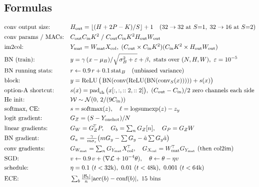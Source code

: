 \subsection*{Formulas}
\begin{align*}
&\text{conv output size:} && H_\text{out}=\lfloor (H+2P-K)/S\rfloor+1 \quad(32\to32 \text{ at } S{=}1,\; 32\to16 \text{ at } S{=}2)\\
&\text{conv params / MACs:} && C_\text{out}C_\text{in}K^2 \;/\; C_\text{out}C_\text{in}K^2H_\text{out}W_\text{out}\\
&\text{im2col:} && Y_\text{mat}=W_\text{mat}X_\text{col},\; (C_\text{out}\times C_\text{in}K^2)(C_\text{in}K^2\times H_\text{out}W_\text{out})\\
&\text{BN (train):} && y=\gamma\,(x-\mu_B)/\sqrt{\sigma_B^2+\varepsilon}+\beta, \text{ stats over } (N,H,W),\ \varepsilon=10^{-5}\\
&\text{BN running stats:} && r\leftarrow0.9\,r+0.1\,\text{stat}_B \quad(\text{unbiased variance})\\
&\text{block:} && y=\ReLU\big(\BN(\conv(\ReLU(\BN(\conv_S(x)))))+s(x)\big)\\
&\text{option-A shortcut:} && s(x)=\operatorname{pad}_\text{ch}\big(x[:,:,::2,::2]\big),\ (C_\text{out}-C_\text{in})/2 \text{ zero channels each side}\\
&\text{He init:} && \mathcal W\sim\mathcal N(0,\,2/(9C_\text{in}))\\
&\text{softmax, CE:} && s=\softmax(z),\quad \ell=\operatorname{logsumexp}(z)-z_y\\
&\text{logit gradient:} && G_Z=(S-Y_\text{onehot})/N\\
&\text{linear gradients:} && G_W=G_Z\T P,\quad G_b=\textstyle\sum_nG_Z[n],\quad G_P=G_ZW\\
&\text{BN gradient:} && G_a=\tfrac{\gamma}{m\sigma_\varepsilon}\big(mG_y-\textstyle\sum G_y-\hat a\sum G_y\hat a\big)\\
&\text{conv gradients:} && G_{W_\text{mat}}=\textstyle\sum_nG_{Y_\text{mat}}X_\text{col}\T,\quad G_{X_\text{col}}=W_\text{mat}\T G_{Y_\text{mat}}\ (\text{then col2im})\\
&\text{SGD:} && v\leftarrow0.9\,v+(\nabla\mathcal L+10^{-4}\theta),\quad \theta\leftarrow\theta-\eta v\\
&\text{schedule:} && \eta=0.1\ (t<32\text{k}),\ 0.01\ (t<48\text{k}),\ 0.001\ (t<64\text{k})\\
&\text{ECE:} && \textstyle\sum_b\frac{|\mathcal B_b|}{n}|\text{acc}(b)-\text{conf}(b)|,\ 15 \text{ bins}
\end{align*}

